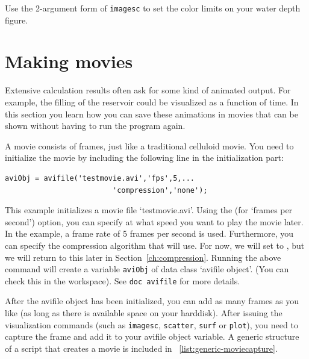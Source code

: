 \begin{action}
Use the 2-argument form of {\tt imagesc} to set the color limits on your water depth figure.
\end{action}

\section{Making movies}
Extensive calculation results often ask for some kind of animated output. For example, the filling of the reservoir could be visualized as a function of time. In this section you learn how you can save these animations in movies that can be shown without having to run the \MATLAB{} program again.

\noindent A movie consists of frames, just like a traditional celluloid movie. You need to initialize the movie by including the following line in the initialization part:
\begin{lstlisting}[numbers=none]
aviObj = avifile('testmovie.avi','fps',5,...
                         'compression','none');
\end{lstlisting}

\noindent This example initializes a movie file `testmovie.avi'. Using the {\tt {}} (for `frames per second') option, you can specify at what speed you want to play the movie later. In the example, a frame rate of 5 frames per second is used. Furthermore, you can specify the compression algorithm that \MATLAB{} will use. For now, we will set {\tt {}} to {\tt {}}, but we will return to this later in Section~\ref{ch:compression}. Running the above command will create a variable {\tt aviObj} of data class `avifile object'. (You can check this in the workspace). See {\tt doc avifile} for more details.

\noindent After the avifile object has been initialized, you can add as many frames as you like (as long as there is available space on your harddisk). After issuing the visualization commands (such as {\tt imagesc}, {\tt scatter}, {\tt surf} or {\tt plot}), you need to capture the frame and add it to your avifile object variable. A generic structure of a script that creates a movie is included in \lstlistingname~\ref{list:generic-moviecapture}.


